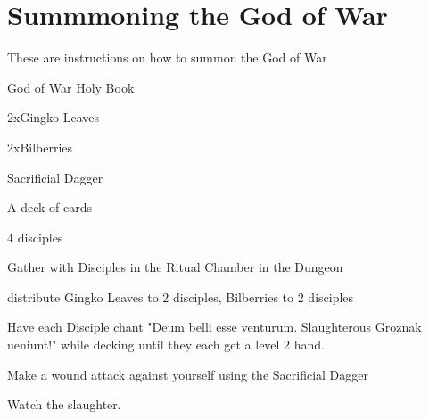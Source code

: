 \documentclass[green]{guildcamp2}
\begin{document}
\name{\gGoWrit{}}

\section{Summmoning the God of War}
These are instructions on how to summon the God of War

\begin{enum}[Requirements]
	\item God of War Holy Book
	\item 2xGingko Leaves
	\item 2xBilberries
	\item Sacrificial Dagger
	\item A deck of cards
	\item 4 disciples
\end{enum}

\begin{enum}[Directions]
	\item Gather with Disciples in the Ritual Chamber in the Dungeon
	\item distribute Gingko Leaves to 2 disciples, Bilberries to 2 disciples
	\item Have each Disciple chant "Deum belli esse venturum. Slaughterous Groznak ueniunt!" while decking until they each get a level 2 hand.
	\item Make a wound attack against yourself using the Sacrificial Dagger
	\item Watch the slaughter.
\end{enum}
	
\end{document}
